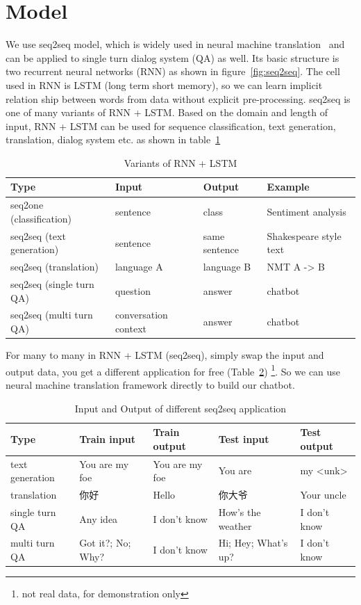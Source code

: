 \documentclass{article}
\begin{document}
\section{Model}
\label{sec:model}

We use seq2seq model, which is widely used in neural machine translation~\cite{sutskever2014sequence}
and can be applied to single turn dialog system (QA) as well.
Its basic structure is two recurrent neural networks (RNN) as shown in figure~\ref{fig:seq2seq}.
The cell used in RNN is LSTM (long term short memory),
so we can learn implicit relation ship between words from data without explicit pre-processing.
seq2seq is one of many variants of RNN + LSTM. Based on the domain and length of input,
RNN + LSTM can be used for sequence classification, text generation, translation, dialog system etc.
as shown in table~\ref{table:RNN+LSTM}

\begin{table}[h]
    \caption{Variants of RNN + LSTM}
    \label{table:RNN+LSTM}
    \centering
    \begin{tabular}{llll}
        \toprule
        Type & Input & Output & Example \\
        \midrule
        seq2one (classification) & sentence & class & Sentiment analysis \\
        seq2seq (text generation) & sentence & same sentence & Shakespeare style text \\
        seq2seq (translation) & language A & language B & NMT A -> B \\
        seq2seq (single turn QA) & question & answer & chatbot \\
        seq2seq (multi turn QA) & conversation context & answer & chatbot \\
        \bottomrule
    \end{tabular}
\end{table}

For many to many in RNN + LSTM (seq2seq), simply swap the input and output data, you get a different application for free
(Table~\ref{table:seq2seq-app}) \footnote{not real data, for demonstration only}.
So we can use neural machine translation framework directly to build our chatbot.

\begin{table}[h]
    \caption{Input and Output of different seq2seq application}
    \label{table:seq2seq-app}
    \centering
    \begin{tabular}{lllll}
        \toprule
        Type & Train input & Train output & Test input & Test output \\
        \midrule
        text generation & You are my foe & You are my foe & You are & my <unk>\\
        translation & {\cjkfont 你好} & Hello & {\cjkfont 你大爷} & Your uncle \\
        single turn QA & Any idea & I don't know & How's the weather & I don't know \\
        multi turn QA & Got it?; No; Why? & I don't know & Hi; Hey; What's up? & I don't know \\
        \bottomrule
    \end{tabular}
\end{table}
\end{document}
